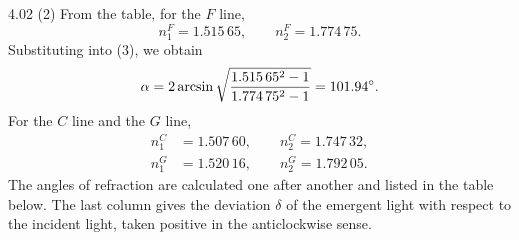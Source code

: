 \begin{solution}{4.02}
(2) From the table, for the $F$ line,
\begin{equation*}
n_1^F = 1.515\,65,\qquad n_2^F = 1.774\,75.
\end{equation*}
Substituting into (3), we obtain
\begin{equation*}
\alpha = 2\arcsin\sqrt{\frac{1.515\,65^2-1}{1.774\,75^2-1}} = 101.94^{\circ}.
\end{equation*}
For the $C$ line and the $G$ line,
\begin{align*}
n_1^C &= 1.507\,60,\qquad n_2^C = 1.747\,32,\\
n_1^G &= 1.520\,16,\qquad n_2^G = 1.792\,05.
\end{align*}
The angles of refraction are calculated one after another and listed in the table below. The last
column gives the deviation $\delta$ of the emergent light with respect to the incident light, taken
positive in the anticlockwise sense.
\end{solution}

